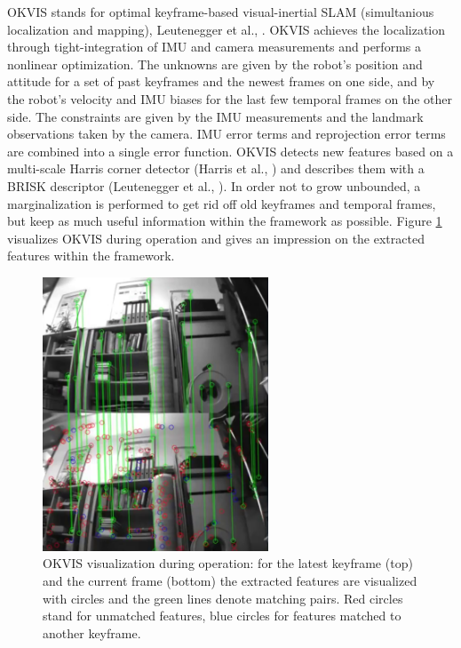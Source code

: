 OKVIS stands for optimal keyframe-based visual-inertial SLAM (simultanious localization and mapping), Leutenegger et al., \cite{leutenegger2015keyframe}. OKVIS achieves the localization through tight-integration of IMU and camera measurements and performs a nonlinear optimization. The unknowns are given by the robot's position and attitude for a set of past keyframes and the newest frames on one side, and by the robot's velocity and IMU biases for the last few temporal frames on the other side. The constraints are given by the IMU measurements and the landmark observations taken by the camera. IMU error terms and reprojection error terms are combined into a single error function. OKVIS detects new features based on a multi-scale Harris corner detector (Harris et al., \cite{harris1988combined}) and describes them with a BRISK descriptor (Leutenegger et al., \cite{leutenegger2011brisk}). In order not to grow unbounded, a marginalization is performed to get rid off old keyframes and temporal frames, but keep as much useful information within the framework as possible. Figure \ref{pics:okvis_frontend} visualizes OKVIS during operation and gives an impression on the extracted features within the framework.

\begin{figure}[h]
   \centering
   \includegraphics[width=0.6\textwidth]{images/okvis_frontend.png}
   \caption{OKVIS visualization during operation: for the latest keyframe (top) and the current frame (bottom) the extracted features are visualized with circles and the green lines denote matching pairs. Red circles stand for unmatched features, blue circles for features matched to another keyframe.}
   \label{pics:okvis_frontend}
\end{figure}

